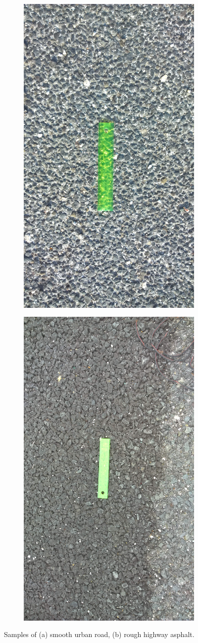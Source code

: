 \begin{figure}[h]
	\centering
	\begin{subfigure}[b]{0.48\textwidth}
		\centering
		\includegraphics[width=0.45\columnwidth, angle = 270]{img/Smooth.jpg}
	\end{subfigure}
	\hfill 
	\begin{subfigure}[b]{0.48\textwidth}
		\centering   
		\includegraphics[width=0.45\columnwidth, angle = 270]{img/Rough.jpg} 
	\end{subfigure} 
	\caption[Road Samples]{Samples of (a) smooth urban road, (b) rough highway asphalt.}
	\label{fig:road}
\end{figure}


